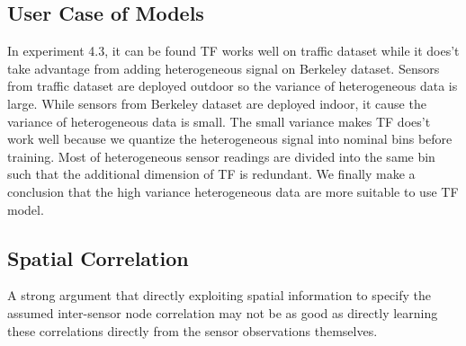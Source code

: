 \subsection{User Case of Models}


In experiment 4.3, it can be found TF works well on traffic dataset while it does't take advantage from adding heterogeneous signal on Berkeley dataset.
Sensors from traffic dataset are deployed outdoor so the variance of heterogeneous data is large.
While sensors from Berkeley dataset are deployed indoor, it cause the variance of heterogeneous data is small.
The small variance makes TF does't work well because we quantize the heterogeneous signal into nominal bins before training.
Most of heterogeneous sensor readings are divided into the same bin such that the additional dimension of TF is redundant.
We finally make a conclusion that the high variance heterogeneous data are more suitable to use TF model.

\subsection{Spatial Correlation}
A strong argument that directly exploiting spatial information to specify the assumed inter-sensor node correlation may not be as good as directly learning these correlations directly from the sensor observations themselves.

